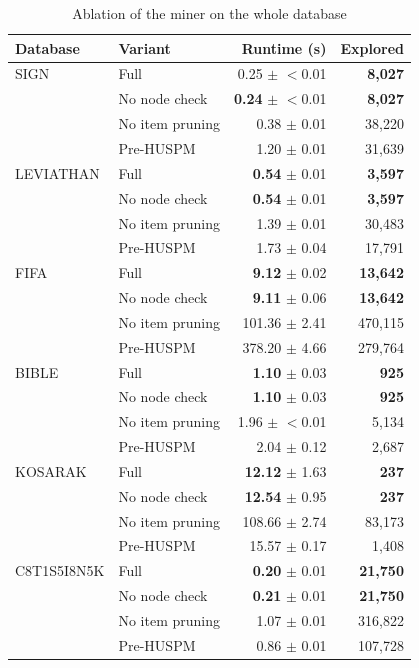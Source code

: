 \begin{table}[!htbp]
\centering
\caption{Ablation of the miner on the whole database}
\label{tab:sc7_ablation}
\begin{tabular*}{\textwidth}{@{\extracolsep\fill}llrr}
\toprule
Database & Variant & Runtime (s) & Explored \\
\midrule
SIGN & Full & 0.25 $\pm$ $<$0.01 & \textbf{8,027} \\
 & No node check & \textbf{0.24} $\pm$ $<$0.01 & \textbf{8,027} \\
 & No item pruning & 0.38 $\pm$ 0.01 & 38,220 \\
 & Pre-HUSPM & 1.20 $\pm$ 0.01 & 31,639 \\
LEVIATHAN & Full & \textbf{0.54} $\pm$ 0.01 & \textbf{3,597} \\
 & No node check & \textbf{0.54} $\pm$ 0.01 & \textbf{3,597} \\
 & No item pruning & 1.39 $\pm$ 0.01 & 30,483 \\
 & Pre-HUSPM & 1.73 $\pm$ 0.04 & 17,791 \\
FIFA & Full & \textbf{9.12} $\pm$ 0.02 & \textbf{13,642} \\
 & No node check & \textbf{9.11} $\pm$ 0.06 & \textbf{13,642} \\
 & No item pruning & 101.36 $\pm$ 2.41 & 470,115 \\
 & Pre-HUSPM & 378.20 $\pm$ 4.66 & 279,764 \\
BIBLE & Full & \textbf{1.10} $\pm$ 0.03 & \textbf{925} \\
 & No node check & \textbf{1.10} $\pm$ 0.03 & \textbf{925} \\
 & No item pruning & 1.96 $\pm$ $<$0.01 & 5,134 \\
 & Pre-HUSPM & 2.04 $\pm$ 0.12 & 2,687 \\
KOSARAK & Full & \textbf{12.12} $\pm$ 1.63 & \textbf{237} \\
 & No node check & \textbf{12.54} $\pm$ 0.95 & \textbf{237} \\
 & No item pruning & 108.66 $\pm$ 2.74 & 83,173 \\
 & Pre-HUSPM & 15.57 $\pm$ 0.17 & 1,408 \\
C8T1S5I8N5K & Full & \textbf{0.20} $\pm$ 0.01 & \textbf{21,750} \\
 & No node check & \textbf{0.21} $\pm$ 0.01 & \textbf{21,750} \\
 & No item pruning & 1.07 $\pm$ 0.01 & 316,822 \\
 & Pre-HUSPM & 0.86 $\pm$ 0.01 & 107,728 \\

\end{tabular*}
\end{table}
